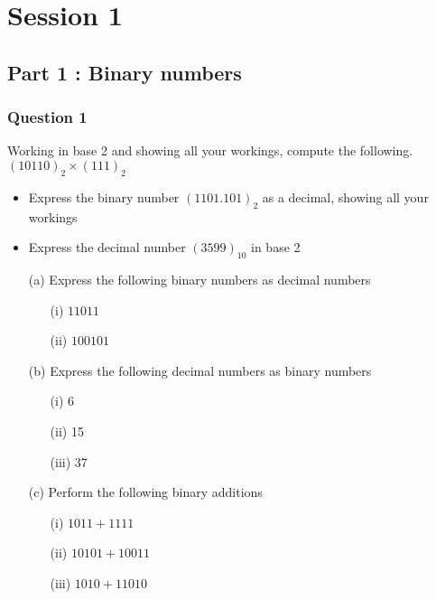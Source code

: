 \documentclass[]{report}
\begin{document}
%
%
%


\chapter{Session 1}

\section*{Part 1 : Binary numbers}
\subsection*{Question 1 }
Working in base 2 and showing all your workings, compute the following.
$(10110)_2 \times (111)_2$

\begin{itemize}
	\item Express the binary number $(1101.101)_2$ as a decimal, showing all your workings
	\item Express the decimal number $(3599)_{10}$ in base 2
\end{itemize}



\begin{itemize}
	\item[(a)] Express the following binary numbers as decimal numbers
	\begin{itemize}
		\item[(i)] $11011$
		\item[(ii)] $100101$
	\end{itemize}
	\item[(b)] Express the following decimal numbers as binary numbers
	\begin{itemize}
		\item[(i)] 6
		\item[(ii)] 15
		\item[(iii)] 37
	\end{itemize}
	\item[(c)] Perform the following binary additions
	\begin{itemize}
		\item[(i)] $1011+ 1111$
		\item[(ii)] $10101  + 10011$
		\item[(iii)] $1010 + 11010$
	\end{itemize}
	
\end{itemize}
\end{document}
